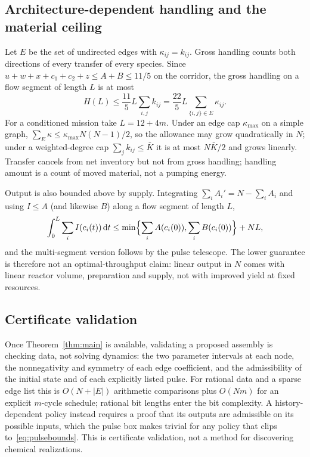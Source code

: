 \documentclass[11pt,a4paper]{article}
\theoremstyle{plain}
\theoremstyle{definition}
\theoremstyle{remark}
\newcommand{\dd}{\,\mathrm d}
\newcommand{\Iv}{I}
\begin{document}
\subsection{Architecture-dependent handling and the material ceiling}
Let $E$ be the set of undirected edges with $\kappa_{ij}=k_{ij}$. Gross handling counts both directions of every transfer of every species. Since $u+w+x+c_1+c_2+z\le A+B\le11/5$ on the corridor, the gross handling on a flow segment of length $L$ is at most
\begin{equation}\label{eq:handling}
H(L)\le\frac{11}5L\sum_{i,j}k_{ij}=\frac{22}5L\sum_{\{i,j\}\in E}\kappa_{ij}.
\end{equation}
For a conditioned mission take $L=12+4m$. Under an edge cap $\kappa_{\max}$ on a simple graph, $\sum_E\kappa\le\kappa_{\max}N(N-1)/2$, so the allowance may grow quadratically in $N$; under a weighted-degree cap $\sum_jk_{ij}\le\bar K$ it is at most $N\bar K/2$ and grows linearly. Transfer cancels from net inventory but not from gross handling; handling amount is a count of moved material, not a pumping energy.

Output is also bounded above by supply. Integrating $\sum_iA_i'=N-\sum_iA_i$ and using $\Iv\le A$ (and likewise $B$) along a flow segment of length $L$,
\begin{equation}\label{eq:ceiling}
\int_0^L\sum_i\Iv(c_i(t))\dd t\le\min\Bigl\{\sum_iA(c_i(0)),\sum_iB(c_i(0))\Bigr\}+NL,
\end{equation}
and the multi-segment version follows by the pulse telescope. The lower guarantee is therefore not an optimal-throughput claim: linear output in $N$ comes with linear reactor volume, preparation and supply, not with improved yield at fixed resources.

\subsection{Certificate validation}
Once Theorem~\ref{thm:main} is available, validating a proposed assembly is checking data, not solving dynamics: the two parameter intervals at each node, the nonnegativity and symmetry of each edge coefficient, and the admissibility of the initial state and of each explicitly listed pulse. For rational data and a sparse edge list this is $O(N+|E|)$ arithmetic comparisons plus $O(Nm)$ for an explicit $m$-cycle schedule; rational bit lengths enter the bit complexity. A history-dependent policy instead requires a proof that its outputs are admissible on its possible inputs, which the pulse box makes trivial for any policy that clips to~\eqref{eq:pulsebounds}. This is certificate validation, not a method for discovering chemical realizations.
\end{document}
